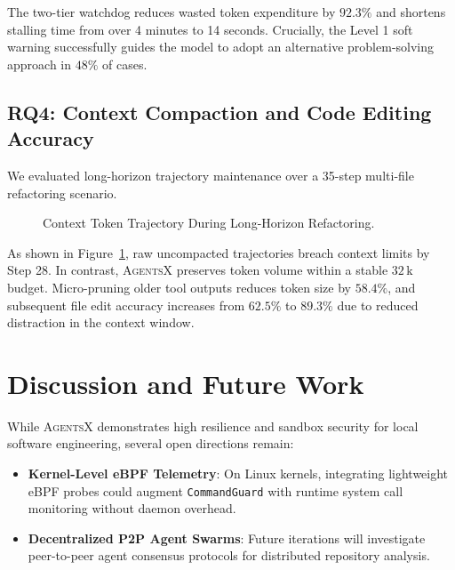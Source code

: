 \documentclass[10pt,twocolumn,letterpaper]{article}
\begin{document}
The two-tier watchdog reduces wasted token expenditure by $92.3\%$ and shortens stalling time from over 4 minutes to 14 seconds. Crucially, the Level 1 soft warning successfully guides the model to adopt an alternative problem-solving approach in $48\%$ of cases.

\subsection{RQ4: Context Compaction and Code Editing Accuracy}
We evaluated long-horizon trajectory maintenance over a 35-step multi-file refactoring scenario.

\begin{figure}[htbp]
\centering
{}
\caption{Context Token Trajectory During Long-Horizon Refactoring.}
\label{fig:tokens}
\end{figure}

As shown in Figure~\ref{fig:tokens}, raw uncompacted trajectories breach context limits by Step 28. In contrast, \textsc{AgentsX} preserves token volume within a stable $32\,\text{k}$ budget. Micro-pruning older tool outputs reduces token size by $58.4\%$, and subsequent file edit accuracy increases from $62.5\%$ to $89.3\%$ due to reduced distraction in the context window.

\section{Discussion and Future Work}
\label{sec:discussion}

While \textsc{AgentsX} demonstrates high resilience and sandbox security for local software engineering, several open directions remain:
\begin{itemize}
    \item \textbf{Kernel-Level eBPF Telemetry}: On Linux kernels, integrating lightweight eBPF probes could augment \texttt{CommandGuard} with runtime system call monitoring without daemon overhead.
    \item \textbf{Decentralized P2P Agent Swarms}: Future iterations will investigate peer-to-peer agent consensus protocols for distributed repository analysis.
\end{itemize}
\end{document}
